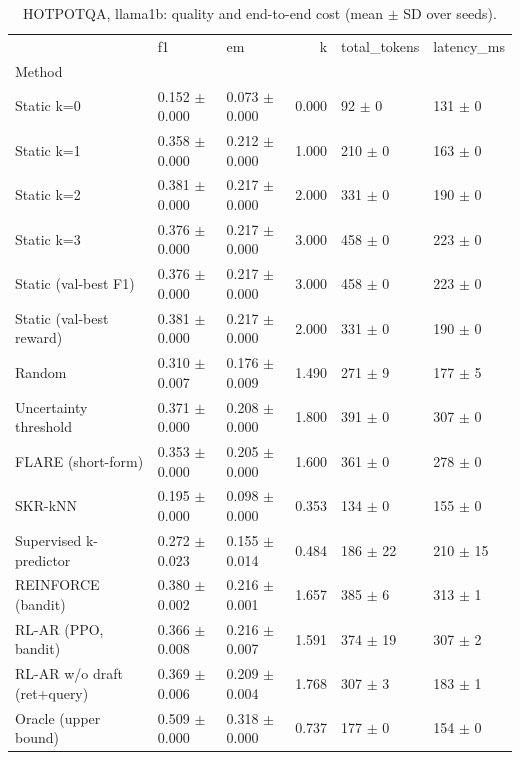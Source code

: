 \begin{table}
\caption{HOTPOTQA, llama1b: quality and end-to-end cost (mean $\pm$ SD over seeds).}
\begin{tabular}{lllrll}
\toprule
 & f1 & em & k & total_tokens & latency_ms \\
Method &  &  &  &  &  \\
\midrule
Static k=0 & 0.152 $\pm$ 0.000 & 0.073 $\pm$ 0.000 & 0.000 & 92 $\pm$ 0 & 131 $\pm$ 0 \\
Static k=1 & 0.358 $\pm$ 0.000 & 0.212 $\pm$ 0.000 & 1.000 & 210 $\pm$ 0 & 163 $\pm$ 0 \\
Static k=2 & 0.381 $\pm$ 0.000 & 0.217 $\pm$ 0.000 & 2.000 & 331 $\pm$ 0 & 190 $\pm$ 0 \\
Static k=3 & 0.376 $\pm$ 0.000 & 0.217 $\pm$ 0.000 & 3.000 & 458 $\pm$ 0 & 223 $\pm$ 0 \\
Static (val-best F1) & 0.376 $\pm$ 0.000 & 0.217 $\pm$ 0.000 & 3.000 & 458 $\pm$ 0 & 223 $\pm$ 0 \\
Static (val-best reward) & 0.381 $\pm$ 0.000 & 0.217 $\pm$ 0.000 & 2.000 & 331 $\pm$ 0 & 190 $\pm$ 0 \\
Random & 0.310 $\pm$ 0.007 & 0.176 $\pm$ 0.009 & 1.490 & 271 $\pm$ 9 & 177 $\pm$ 5 \\
Uncertainty threshold & 0.371 $\pm$ 0.000 & 0.208 $\pm$ 0.000 & 1.800 & 391 $\pm$ 0 & 307 $\pm$ 0 \\
FLARE (short-form) & 0.353 $\pm$ 0.000 & 0.205 $\pm$ 0.000 & 1.600 & 361 $\pm$ 0 & 278 $\pm$ 0 \\
SKR-kNN & 0.195 $\pm$ 0.000 & 0.098 $\pm$ 0.000 & 0.353 & 134 $\pm$ 0 & 155 $\pm$ 0 \\
Supervised k-predictor & 0.272 $\pm$ 0.023 & 0.155 $\pm$ 0.014 & 0.484 & 186 $\pm$ 22 & 210 $\pm$ 15 \\
REINFORCE (bandit) & 0.380 $\pm$ 0.002 & 0.216 $\pm$ 0.001 & 1.657 & 385 $\pm$ 6 & 313 $\pm$ 1 \\
RL-AR (PPO, bandit) & 0.366 $\pm$ 0.008 & 0.216 $\pm$ 0.007 & 1.591 & 374 $\pm$ 19 & 307 $\pm$ 2 \\
RL-AR w/o draft (ret+query) & 0.369 $\pm$ 0.006 & 0.209 $\pm$ 0.004 & 1.768 & 307 $\pm$ 3 & 183 $\pm$ 1 \\
Oracle (upper bound) & 0.509 $\pm$ 0.000 & 0.318 $\pm$ 0.000 & 0.737 & 177 $\pm$ 0 & 154 $\pm$ 0 \\
\bottomrule
\end{tabular}
\end{table}

